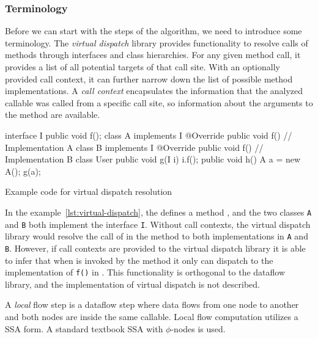 \subsubsection*{Terminology}
Before we can start with the steps of the algorithm, we need to introduce some terminology.
The \emph{virtual dispatch} library provides functionality to resolve calls of 
methods through interfaces and class hierarchies.
For any given method call, it provides a list of all potential targets of that
call site.
With an optionally provided call context, it can further narrow down the list of
possible method implementations.
A \emph{call context} encapsulates the information that the analyzed callable was
called from a specific call site, so information about the arguments to the 
method are available.
\begin{listing}
    \begin{javacode}
interface I {
    public void f();
}
class A implements I {
    @Override
    public void f() {
        // Implementation A
    }
}
class B implements I {
    @Override
    public void f() {
        // Implementation B
    }
}
class User {
    public void g(I i) {
        i.f();
    }
    public void h() {
        A a = new A();
        g(a);
    }
}
    \end{javacode}
    \caption{Example code for virtual dispatch resolution}
    \label{lst:virtual-dispatch}
\end{listing}
In the example~\autoref{lst:virtual-dispatch}, the  defines a
 method , and the two 
classes \texttt{A} and \texttt{B} both implement the interface \texttt{I}.
Without call contexts, the virtual dispatch library would resolve the call 
of  in the method  to both 
implementations in \texttt{A} and \texttt{B}.
However, if call contexts are provided to the virtual dispatch library 
it is able to infer that when  is invoked by the method 
 it only can dispatch to the implementation of \texttt{f()} in 
.
This functionality is orthogonal to the dataflow library, and the implementation 
of virtual dispatch is not described.

A \emph{local} flow step is a dataflow step where data flows from one node to another
and both nodes are inside the same callable.
Local flow computation utilizes a SSA form.
A standard textbook SSA with $\phi$-nodes is used.

